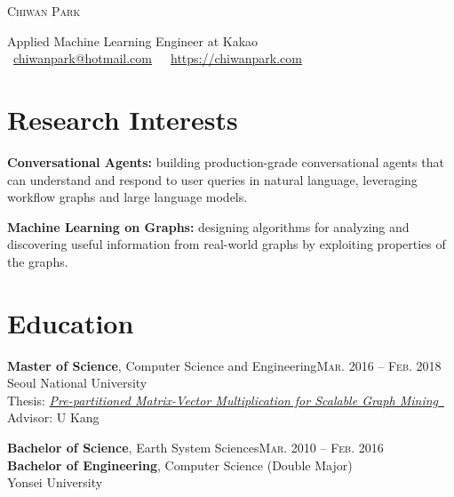 \documentclass[11pt,a4paper]{article}
\makeatletter
\def\myname{Chiwan Park}
\def\myemail{chiwanpark@hotmail.com}
\def\myhomepage{https://chiwanpark.com}
\newenvironment{entry}{
  \begin{list}{}{
    \setlength{\leftmargin}{0em}
    \setlength{\itemsep}{0.25em}
    \setlength{\parskip}{0pt}
    \setlength{\parsep}{0.25em}
  }
}{
  \end{list}
}
\let\orighref\href
\renewcommand{\href}[2]{\orighref{#1}{#2\ {\scriptsize\faIcon{external-link-alt}}}}
\makeatother
\begin{document}
\begin{minipage}[t]{0.375\textwidth}
    \vspace{0pt}
    \Huge
    \textsc{\myname}
\end{minipage}
\hfill
\begin{minipage}[t]{0.6\textwidth}
  \vspace{0pt}
  Applied Machine Learning Engineer at Kakao\\
  {\scriptsize{}}\ \orighref{mailto:\myemail}{\myemail}\ \ {\scriptsize{}}\ \orighref{\myhomepage}{\myhomepage}
\end{minipage}

\section*{Research Interests}
\begin{entry}
  \item \textbf{Conversational Agents:} building production-grade conversational agents that can understand and respond to user queries in natural language, leveraging workflow graphs and large language models.
  \item \textbf{Machine Learning on Graphs:} designing algorithms for analyzing and discovering useful information from real-world graphs by exploiting properties of the graphs.
\end{entry}

\section*{Education}
\begin{entry}
  \item \textbf{Master of Science}, Computer Science and Engineering\hfill\textsc{Mar. 2016 -- Feb. 2018}\\
        Seoul National University\\
        Thesis: \href{https://s-space.snu.ac.kr/bitstream/10371/141560/1/000000151119.pdf}{\textit{Pre-partitioned Matrix-Vector Multiplication for Scalable Graph Mining}}\\
        Advisor: U Kang
  \item \textbf{Bachelor of Science}, Earth System Sciences\hfill\textsc{Mar. 2010 -- Feb. 2016}\\
        \textbf{Bachelor of Engineering}, Computer Science (Double Major)\\
        Yonsei University
\end{entry}
\end{document}
